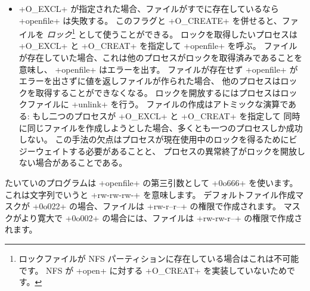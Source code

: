 \begin{itemize}
\item \ml+O_EXCL+ が指定された場合、ファイルがすでに存在しているなら \ml+openfile+ は失敗する。
  このフラグと \ml+O_CREATE+ を併せると、ファイルを \label{page/lock}\emph{ロック}\footnote{ロックファイルが NFS パーティションに存在している場合はこれは不可能です。 NFS が \ml+open+ に対する \ml+O_CREAT+ を実装していないためです。} として使うことができる。
  ロックを取得したいプロセスは \ml+O_EXCL+ と \ml+O_CREAT+ を指定して \ml+openfile+ を呼ぶ。
  ファイルが存在していた場合、これは他のプロセスがロックを取得済みであることを意味し、
  \ml+openfile+ はエラーを出す。
  ファイルが存在せず \ml+openfile+ がエラーを出さずに値を返しファイルが作られた場合、
  他のプロセスはロックを取得することができなくなる。
  ロックを開放するにはプロセスはロックファイルに \ml+unlink+ を行う。
  ファイルの作成はアトミックな演算である: もし二つのプロセスが \ml+O_EXCL+ と \ml+O_CREAT+ を指定して
  同時に同じファイルを作成しようとした場合、多くとも一つのプロセスしか成功しない。
  この手法の欠点はプロセスが現在使用中のロックを得るためにビジーウェイトする必要があることと、
  プロセスの異常終了がロックを開放しない場合があることである。
\end{itemize}
\begin{example}
たいていのプログラムは \ml+openfile+ の第三引数として \ml+0o666+ を使います。
これは文字列でいうと \ml+rw-rw-rw-+ を意味します。
デフォルトファイル作成マスクが \ml+0o022+ の場合、ファイルは \ml+rw-r--r--+ の権限で作成されます。
マスクがより寛大で \ml+0o002+ の場合には、ファイルは \ml+rw-rw-r--+ の権限で作成されます。
\enlargethispage{1\baselineskip} %
\enlargethispage{2\medskipamount} %
\end{example}

